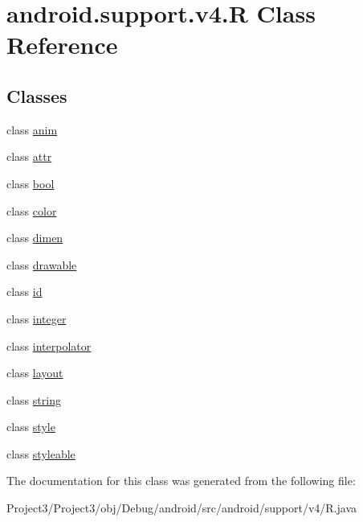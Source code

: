 \hypertarget{classandroid_1_1support_1_1v4_1_1R}{}\section{android.\+support.\+v4.\+R Class Reference}
\label{classandroid_1_1support_1_1v4_1_1R}
\subsection*{Classes}
\begin{DoxyCompactItemize}
\item 
class \hyperlink{classandroid_1_1support_1_1v4_1_1R_1_1anim}{anim}
\item 
class \hyperlink{classandroid_1_1support_1_1v4_1_1R_1_1attr}{attr}
\item 
class \hyperlink{classandroid_1_1support_1_1v4_1_1R_1_1bool}{bool}
\item 
class \hyperlink{classandroid_1_1support_1_1v4_1_1R_1_1color}{color}
\item 
class \hyperlink{classandroid_1_1support_1_1v4_1_1R_1_1dimen}{dimen}
\item 
class \hyperlink{classandroid_1_1support_1_1v4_1_1R_1_1drawable}{drawable}
\item 
class \hyperlink{classandroid_1_1support_1_1v4_1_1R_1_1id}{id}
\item 
class \hyperlink{classandroid_1_1support_1_1v4_1_1R_1_1integer}{integer}
\item 
class \hyperlink{classandroid_1_1support_1_1v4_1_1R_1_1interpolator}{interpolator}
\item 
class \hyperlink{classandroid_1_1support_1_1v4_1_1R_1_1layout}{layout}
\item 
class \hyperlink{classandroid_1_1support_1_1v4_1_1R_1_1string}{string}
\item 
class \hyperlink{classandroid_1_1support_1_1v4_1_1R_1_1style}{style}
\item 
class \hyperlink{classandroid_1_1support_1_1v4_1_1R_1_1styleable}{styleable}
\end{DoxyCompactItemize}


The documentation for this class was generated from the following file\+:\begin{DoxyCompactItemize}
\item 
Project3/\+Project3/obj/\+Debug/android/src/android/support/v4/R.\+java\end{DoxyCompactItemize}
